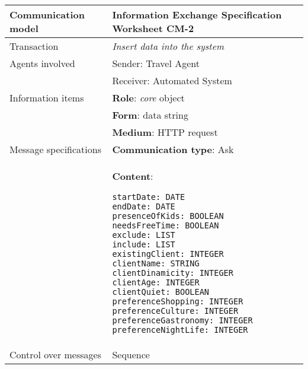 \begin{tabular}%
      {|p{4cm}%
        |p{8cm}|}
\hline
{\bf Communication model} &
   {\bf Information Exchange Specification Worksheet CM-2} \\
\hline
\hline
\sc Transaction &
   {\em
   Insert data into the system
   } \\
\hline
\sc Agents involved &
   {\rm Sender: Travel Agent} \\
   & {\rm Receiver: Automated System}\\
\hline
\sc Information items 
&  {\bf Role}: {\em core} object
   \\
&  {\bf Form}: data string
   \\
&  {\bf Medium}: HTTP request
   \\
\hline
\sc Message specifications 
&  {\bf Communication type}: Ask
   \\
&  {\bf Content}: 
\begin{lstlisting}[breaklines=true,mathescape=true]
startDate: DATE 
endDate: DATE 
presenceOfKids: BOOLEAN
needsFreeTime: BOOLEAN
exclude: LIST
include: LIST
existingClient: INTEGER
clientName: STRING 
clientDinamicity: INTEGER
clientAge: INTEGER
clientQuiet: BOOLEAN
preferenceShopping: INTEGER
preferenceCulture: INTEGER
preferenceGastronomy: INTEGER
preferenceNightLife: INTEGER
\end{lstlisting}
   \\
\hline
\sc Control over messages &
   Sequence
   \\
\hline
\end{tabular}
